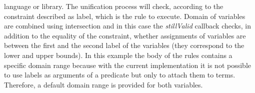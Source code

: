language or library. The unification process will check, according to the constraint described as label, which is the rule
to execute. Domain of variables are combined using intersection and in this case the \textit{stillValid} callback
checks, in addition to the equality of the constraint, whether assignments of variables are between the first and the second label
of the variables (they correspond to the lower and upper bounds).\newline
In this example the body of the rules contains a specific domain range because with the current implementation it is not possible
to use labels as arguments of a predicate but only to attach them to terms. Therefore, a default domain range is
provided for both variables.
